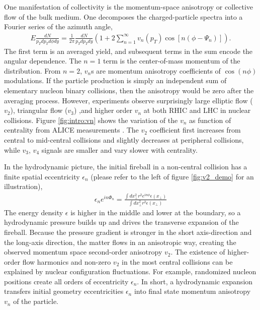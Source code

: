 One manifestation of collectivity is the momentum-space anisotropy or collective flow of the bulk medium.
One decomposes the charged-particle spectra into a Fourier series of the azimuth angle,
\begin{eqnarray}
E\frac{dN}{p_T dp_T d\phi dy} = \frac{1}{2\pi}\frac{dN}{p_T dp_T dy}\left(1 + 2\sum_{n=1}^{\infty}v_n(p_T)\cos\left[n(\phi-\Psi_n)\right]\right).
\end{eqnarray}
The first term is an averaged yield, and subsequent terms in the sum encode the angular dependence. 
The $n=1$ term is the center-of-mass momentum of the distribution.
From $n=2$, $v_n$s are momentum anisotropy coefficients of $\cos({n\phi})$ modulations.
If the particle production is simply an independent sum of elementary nucleon binary collisions, then the anisotropy would be zero after the averaging process. 
However, experiments observe surprisingly large elliptic flow ($v_2$), triangular flow ($v_3$) ,and higher order $v_n$ at both RHIC and LHC in nuclear collisions.
Figure \ref{fig:intro:vn} shows the variation of the $v_n$ as function of centrality from ALICE measurements \cite{ALICE:2011ab,Adam:2016izf}.
The $v_2$ coefficient first increases from central to mid-central collisions and slightly decreases at peripheral collisions, while $v_3$, $v_4$ signals are smaller and vary slower with centrality.

In the hydrodynamic picture, the initial fireball in a non-central collision has a finite spatial eccentricity $\epsilon_n$ (please refer to the left of figure \ref{fig:v2_demo} for an illustration),
\begin{eqnarray}
\epsilon_n e^{i n\Phi_n} = \frac{\int dx_\perp^2 r^2 e^{i n\phi} \epsilon(x_\perp)}{\int dx_\perp^2 r^2 \epsilon(x_\perp)}
\end{eqnarray}
The energy density $\epsilon$ is higher in the middle and lower at the boundary, so a hydrodynamic pressure builds up and drives the transverse expansion of the fireball.
Because the pressure gradient is stronger in the short axis-direction and the long-axis direction, the matter flows in an anisotropic way, creating the observed momentum space second-order anisotropy $v_2$.
The existence of higher-order flow harmonics and non-zero $v_2$ in the most central collisions can be explained by nuclear configuration fluctuations. 
For example, randomized nucleon positions create all orders of eccentricity $\epsilon_n$.
In short, a hydrodynamic expansion transfers initial geometry eccentricities $\epsilon_n$ into final state momentum anisotropy $v_n$ of the particle.


